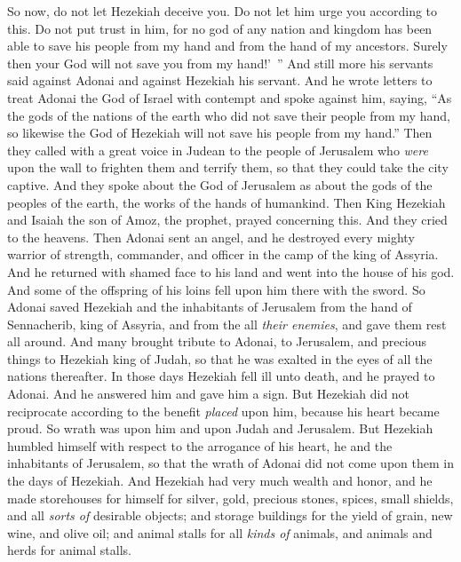 \begin{biblechapter}
\verse So now, do not let Hezekiah deceive you. Do not let him urge you according to this. Do not put trust in him, for no god of any nation and kingdom has been able to save his people from my hand and from the hand of my ancestors. Surely then your God will not save you from my hand!’ ”
\verse And still more his servants said against Adonai and against Hezekiah his servant.
\verse And he wrote letters to treat Adonai the God of Israel with contempt and spoke against him, saying, “As the gods of the nations of the earth who did not save their people from my hand, so likewise the God of Hezekiah will not save his people from my hand.”
\verse Then they called with a great voice in Judean to the people of Jerusalem who \textit{were} upon the wall to frighten them and terrify them, so that they could take the city captive.
\verse And they spoke about the God of Jerusalem as about the gods of the peoples of the earth, the works of the hands of humankind.
 Then King Hezekiah and Isaiah the son of Amoz, the prophet, prayed concerning this. And they cried to the heavens.
\verse Then Adonai sent an angel, and he destroyed every mighty warrior of strength, commander, and officer in the camp of the king of Assyria. And he returned with shamed face to his land and went into the house of his god. And some of the offspring of his loins fell upon him there with the sword.
\verse So Adonai saved Hezekiah and the inhabitants of Jerusalem from the hand of Sennacherib, king of Assyria, and from the all \textit{their enemies}, and gave them rest all around.
\verse And many brought tribute to Adonai, to Jerusalem, and precious things to Hezekiah king of Judah, so that he was exalted in the eyes of all the nations thereafter.
 In those days Hezekiah fell ill unto death, and he prayed to Adonai. And he answered him and gave him a sign.
\verse But Hezekiah did not reciprocate according to the benefit \textit{placed} upon him, because his heart became proud. So wrath was upon him and upon Judah and Jerusalem.
\verse But Hezekiah humbled himself with respect to the arrogance of his heart, he and the inhabitants of Jerusalem, so that the wrath of Adonai did not come upon them in the days of Hezekiah.
\verse And Hezekiah had very much wealth and honor, and he made storehouses for himself for silver, gold, precious stones, spices, small shields, and all \textit{sorts of} desirable objects;
\verse and storage buildings for the yield of grain, new wine, and olive oil; and animal stalls for all \textit{kinds of} animals, and animals and herds for animal stalls.

\end{biblechapter}
